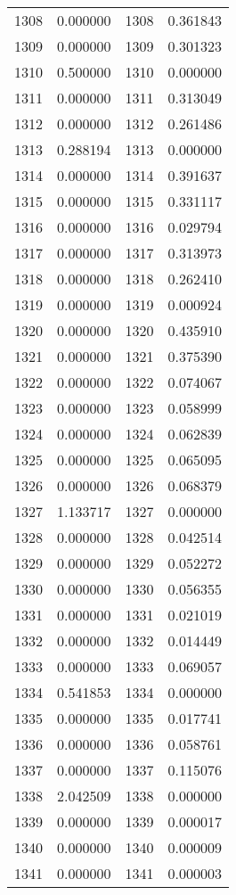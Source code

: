 \documentclass[12pt]{article}
\begin{document}
\begin{longtable}{@{}cccc@{}}
1308 & 0.000000 & 1308 & 0.361843 \\
1309 & 0.000000 & 1309 & 0.301323 \\
1310 & 0.500000 & 1310 & 0.000000 \\
1311 & 0.000000 & 1311 & 0.313049 \\
1312 & 0.000000 & 1312 & 0.261486 \\
1313 & 0.288194 & 1313 & 0.000000 \\
1314 & 0.000000 & 1314 & 0.391637 \\
1315 & 0.000000 & 1315 & 0.331117 \\
1316 & 0.000000 & 1316 & 0.029794 \\
1317 & 0.000000 & 1317 & 0.313973 \\
1318 & 0.000000 & 1318 & 0.262410 \\
1319 & 0.000000 & 1319 & 0.000924 \\
1320 & 0.000000 & 1320 & 0.435910 \\
1321 & 0.000000 & 1321 & 0.375390 \\
1322 & 0.000000 & 1322 & 0.074067 \\
1323 & 0.000000 & 1323 & 0.058999 \\
1324 & 0.000000 & 1324 & 0.062839 \\
1325 & 0.000000 & 1325 & 0.065095 \\
1326 & 0.000000 & 1326 & 0.068379 \\
1327 & 1.133717 & 1327 & 0.000000 \\
1328 & 0.000000 & 1328 & 0.042514 \\
1329 & 0.000000 & 1329 & 0.052272 \\
1330 & 0.000000 & 1330 & 0.056355 \\
1331 & 0.000000 & 1331 & 0.021019 \\
1332 & 0.000000 & 1332 & 0.014449 \\
1333 & 0.000000 & 1333 & 0.069057 \\
1334 & 0.541853 & 1334 & 0.000000 \\
1335 & 0.000000 & 1335 & 0.017741 \\
1336 & 0.000000 & 1336 & 0.058761 \\
1337 & 0.000000 & 1337 & 0.115076 \\
1338 & 2.042509 & 1338 & 0.000000 \\
1339 & 0.000000 & 1339 & 0.000017 \\
1340 & 0.000000 & 1340 & 0.000009 \\
1341 & 0.000000 & 1341 & 0.000003 \\

\end{longtable}
\end{document}
